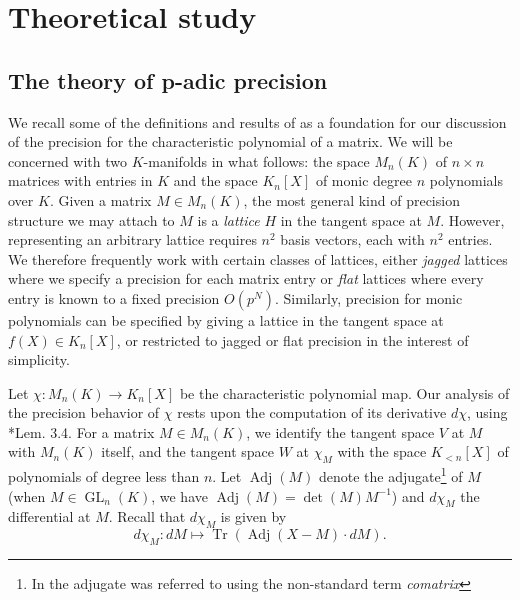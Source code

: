 \documentclass{sig-alternate-05-2015}
\DeclareMathOperator{\GL}{GL}
\DeclareMathOperator{\tr}{Tr}
\DeclareMathOperator{\adj}{Adj}
\begin{document}
\section{Theoretical study}
\label{sec:theo_study}

\subsection{The theory of p-adic precision} \label{sec:padicprec}

We recall some of the definitions and results of \cite{caruso-roe-vaccon:14a}
as a foundation for our discussion of the precision for the characteristic polynomial
of a matrix.  We will be concerned with two $K$-manifolds in what follows:
the space $M_n(K)$ of $n \times n$ matrices with entries in $K$ and the space
$K_n[X]$ of monic degree $n$ polynomials over $K$.  Given a matrix $M \in M_n(K)$,
the most general kind of precision structure we may attach to $M$ is a
\emph{lattice} $H$ in the tangent space at $M$.  However, representing an
arbitrary lattice requires $n^2$ basis vectors, each with $n^2$ entries.  We therefore
frequently work with certain classes of lattices, either \emph{jagged} lattices
where we specify a precision for each matrix entry or \emph{flat} lattices where
every entry is known to a fixed precision $O(p^N)$.  Similarly, precision for
monic polynomials can be specified by giving a lattice in the tangent space
at $f(X) \in K_n[X]$, or restricted to jagged or flat precision in the interest
of simplicity.

Let $\chi : M_n(K) \to K_n[X]$ be the characteristic polynomial map.
Our analysis of the precision behavior of $\chi$ rests upon
the computation of its derivative $d\chi$, using \cite{caruso-roe-vaccon:14a}*{Lem. 3.4}.
For a matrix $M \in M_n(K)$, we identify the tangent space $V$
at $M$ with $M_n(K)$ itself, and the tangent space $W$ at $\chi_M$ with
the space $K_{<n}[X]$ of polynomials of degree less than $n$.
Let $\adj(M)$ denote the adjugate\footnote{In  the adjugate was referred to using the non-standard term \emph{comatrix}} of $M$ (when $M \in \GL_n(K)$,
we have $\adj(M) = \det(M) M^{-1}$) and $d\chi_M$ the differential at $M$.  Recall
that $d\chi_M$ is given by
\begin{equation} \label{eq:dchi}
d\chi_M: dM \mapsto \tr(\adj(X-M) \cdot dM).
\end{equation}
\end{document}
